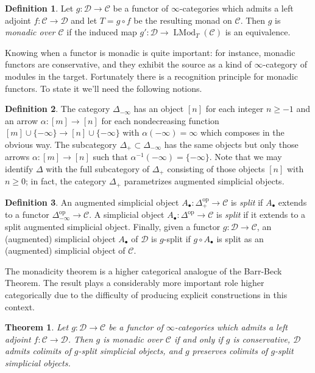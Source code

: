 \documentclass{article}
\newtheorem{theorem}{Theorem}[subsection]
\theoremstyle{definition}
\newtheorem{definition}{Definition}[subsection]
\newcommand{\C}{\mathcal{C}}
\newcommand{\D}{\mathcal{D}}
\renewcommand{\i}{\infty}
\newcommand{\op}{\mathrm{op}}
\DeclareMathOperator{\LMod}{LMod}
\begin{document}
\begin{definition}
Let $g:\D\to\C$ be a functor of $\infty$-categories which admits a left adjoint $f:\C\to\D$ and let $T=g\circ f$ be the resulting monad on $\C$.
Then $g$ is {\em monadic over $\C$} if the induced map $g':\D\to\LMod_T(\C)$ is an equivalence.
\end{definition}

Knowing when a functor is monadic is quite important: for instance, monadic functors are conservative, and they exhibit the source as a kind of $\i$-category of modules in the target.
Fortunately there is a recognition principle for monadic functors. To state it we'll need the following notions.
\begin{definition}
The category $\Delta_{-\i}$ has an object $[n]$ for each integer $n\geq -1$ and an arrow $\alpha:[m]\to[n]$ for each nondecreasing function $[m]\cup\{-\i\}\to[n]\cup\{-\i\}$ with $\alpha(-\i)=\i$ which composes in the obvious way.
The subcategory $\Delta_+\subset\Delta_{-\i}$ has the same objects but only those arrows $\alpha:[m]\to[n]$ such that $\alpha^{-1}(-\i)=\{-\i\}$.
Note that we may identify $\Delta$ with the full subcategory of $\Delta_+$ consisting of those objects $[n]$ with $n\geq 0$; in fact, the category $\Delta_+$ parametrizes augmented simplicial objects.
\end{definition} 

\begin{definition}
An augmented simplicial object $A_\bullet:\Delta_+^{\op}\to\C$ is {\em split} if $A_\bullet$ extends to a functor $\Delta_{-\i}^{\op}\to\C$.
A simplicial object $A_\bullet:\Delta^{\op}\to\C$ is {\em split} if it extends to a split augmented simplicial object.
Finally, given a functor $g:\D\to\C$, an (augmented) simplicial object $A_\bullet$ of $\D$ is $g$-split if $g\circ A_\bullet$ is split as an (augmented) simplicial object of $\C$.
\end{definition}
The monadicity theorem is a higher categorical analogue of the Barr-Beck Theorem.
The result plays a considerably more important role higher categorically due to the difficulty of producing explicit constructions in this context.
\begin{theorem}{\em \cite[Theorem 4.7.3.5]{HA}}\label{thm:bbl}
Let $g:\D\to\C$ be a functor of $\infty$-categories which admits a left adjoint $f:\C\to\D$.
Then $g$ is monadic over $\C$ if and only if $g$ is conservative, $\D$ admits colimits of $g$-split simplicial objects, and $g$ preserves colimits of $g$-split simplicial objects.
\end{theorem}
\end{document}
